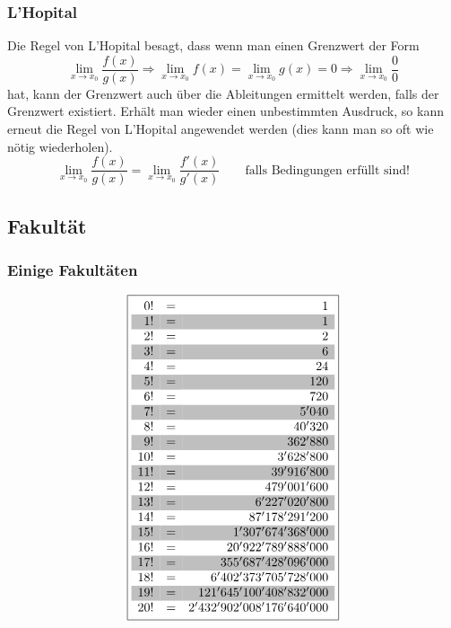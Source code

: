 \subsubsection{L'Hopital}
Die Regel von L'Hopital besagt, dass wenn man einen Grenzwert der Form 
\[ \lim\limits_{x \rightarrow x_0} \frac{f(x)}{g(x)} \Rightarrow \lim\limits_{x \rightarrow x_0} f(x) = \lim\limits_{x \rightarrow x_0} g(x) = 0 \Rightarrow \lim\limits_{x \rightarrow x_0} \frac{0}{0} \] hat, kann der Grenzwert auch über die Ableitungen ermittelt werden, falls der Grenzwert existiert.
Erhält man wieder einen unbestimmten Ausdruck, so kann erneut die Regel von L'Hopital angewendet werden (dies kann man so oft wie nötig wiederholen).
\[ \boxed{ \lim\limits_{x \rightarrow x_0} \frac{f(x)}{g(x)} = \lim\limits_{x \rightarrow x_0} \frac{f'(x)}{g'(x)} \quad} \quad \text{falls Bedingungen erfüllt sind!}\]

\subsection{Fakultät}
\subsubsection{Einige Fakultäten}


\[ \boxed{\begin{array}{rcr}
\rowcolor{white}  0!&=&1\\
\rowcolor{gray}   1!&=&1\\
\rowcolor{white}  2!&=&2\\
\rowcolor{gray}   3!&=&6\\
\rowcolor{white}  4!&=&24\\
\rowcolor{gray}   5!&=&120\\
\rowcolor{white}  6!&=&720\\
\rowcolor{gray}   7!&=&5'040\\
\rowcolor{white}  8!&=&40'320\\
\rowcolor{gray}   9!&=&362'880\\
\rowcolor{white} 10!&=&3'628'800\\
\rowcolor{gray}  11!&=&39'916'800\\
\rowcolor{white} 12!&=&479'001'600\\
\rowcolor{gray}  13!&=&6'227'020'800\\
\rowcolor{white} 14!&=&87'178'291'200\\
\rowcolor{gray}  15!&=&1'307'674'368'000\\
\rowcolor{white} 16!&=&20'922'789'888'000\\
\rowcolor{gray}  17!&=&355'687'428'096'000\\
\rowcolor{white} 18!&=&6'402'373'705'728'000\\
\rowcolor{gray}  19!&=&121'645'100'408'832'000\\
\rowcolor{white} 20!&=&2'432'902'008'176'640'000\\
\end{array}}\]